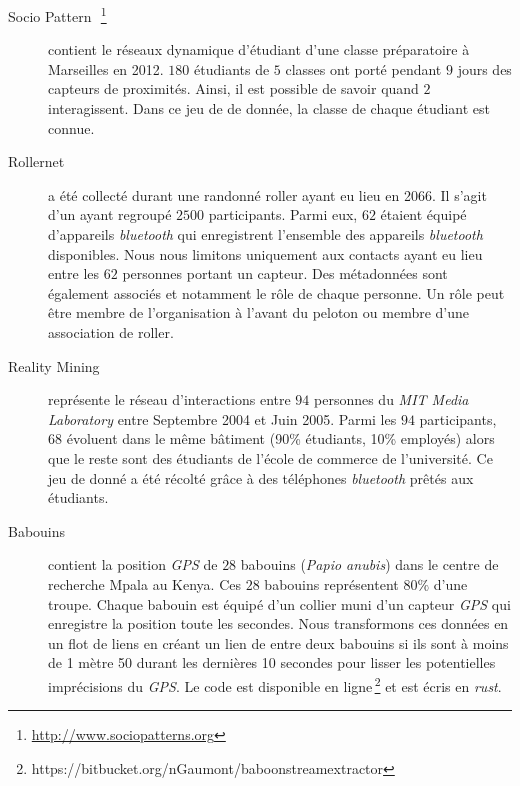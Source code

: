 \begin{description}
\item[Socio Pattern~\cite{Fournet2014}\,\footnote{\url{http://www.sociopatterns.org}}] contient le réseaux dynamique d'étudiant d'une classe préparatoire à Marseilles en 2012. $180$ étudiants de $5$ classes ont porté pendant $9$ jours des capteurs de proximités.
Ainsi, il est possible de savoir quand $2$ interagissent. 
Dans ce jeu de de donnée, la classe de chaque étudiant est connue.\\

\item[Rollernet~\cite{Tournoux2009}] a été collecté durant une randonné roller ayant eu lieu en 2066.
Il s'agit d'un ayant regroupé $2500$ participants.
Parmi eux, $62$ étaient équipé d'appareils \emph{bluetooth} qui enregistrent l'ensemble des appareils \emph{bluetooth} disponibles.
Nous nous limitons uniquement aux contacts ayant eu lieu entre les $62$ personnes portant un capteur.
Des métadonnées sont également associés et notamment le rôle de chaque personne.
Un rôle peut être membre de l'organisation à l'avant du peloton ou membre d'une association de roller.\\

\item[Reality Mining~\cite{Eagle2009}] représente le réseau d'interactions entre $94$ personnes du \emph{MIT Media Laboratory} entre Septembre 2004 et Juin 2005.
Parmi les $94$ participants, $68$ évoluent dans le même bâtiment (90\% étudiants, 10\% employés) alors que le reste sont des étudiants de l'école de commerce de l'université.
Ce jeu de donné a été récolté grâce à des téléphones \emph{bluetooth} prêtés aux étudiants.\\

\item[Babouins~\cite{Crofoot2015,Strandburg-Peshkin2015}] contient la position \emph{GPS} de $28$ babouins (\emph{Papio anubis}) dans le centre de recherche Mpala au Kenya.
Ces $28$ babouins représentent $80\%$ d'une troupe.
Chaque babouin est équipé d'un collier muni d'un capteur \emph{GPS} qui enregistre la position toute les secondes.
Nous transformons ces données en un flot de liens en créant un lien de entre deux babouins si ils sont à moins de 1 mètre 50 durant les dernières 10 secondes pour lisser les potentielles imprécisions du \emph{GPS}.
Le code est disponible en ligne\,\footnote{https://bitbucket.org/nGaumont/baboonstreamextractor} et est écris en \emph{rust}.
\end{description}

